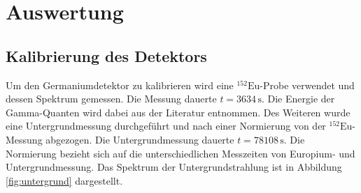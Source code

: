 \section{Auswertung}
\label{sec:Auswertung}

      


\subsection{Kalibrierung des Detektors} \label{sec:kalibrierung}
Um den Germaniumdetektor zu kalibrieren wird eine $^{152}\text{Eu}$-Probe verwendet und dessen Spektrum gemessen.
Die Messung dauerte $t = 3634 \, \si{\second}$.
Die Energie der Gamma-Quanten wird dabei aus der Literatur entnommen. 
Des Weiteren wurde eine Untergrundmessung durchgeführt und nach einer Normierung von der $^{152}\text{Eu}$-Messung abgezogen.
Die Untergrundmessung dauerte $t = 78108 \, \si{\second}$.
Die Normierung bezieht sich auf die unterschiedlichen Messzeiten von Europium- und Untergrundmessung.
Das Spektrum der Untergrundstrahlung ist in Abbildung \ref{fig:untergrund} dargestellt.

